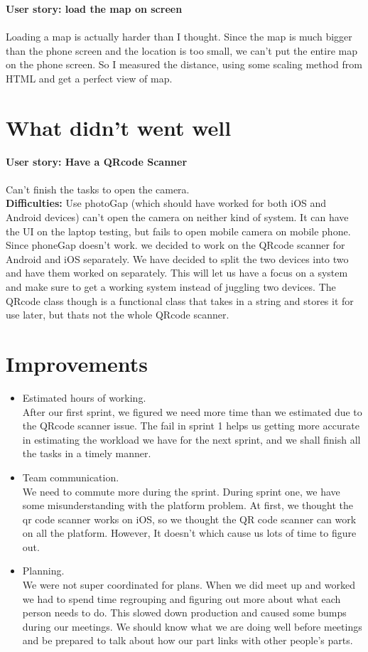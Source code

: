 \documentclass[12pt]{article}
\begin{document}
\textbf{User story: load the map on screen} \\ \\
Loading a map is actually harder than I thought. Since the map is much bigger than the phone screen and the location is too small, we can’t put the entire map on the phone screen. So I measured the distance, using some scaling method from HTML and get a perfect view of map. \\



\section{What didn't went well}


\textbf{User story: Have a QR­code Scanner} \\ \\
Can’t finish the tasks to open the camera.  \\

\textbf{Difficulties: } Use photoGap (which should have worked for both iOS and Android devices) can’t open the camera on neither kind of system. It can have the UI on the laptop testing, but fails to open mobile camera on mobile phone. Since phoneGap doesn’t work. we decided to work on the QRcode scanner for Android and iOS separately.  We have decided to split the two devices into two and have them worked on separately. This will let us have a focus on a system and make sure to get a working system instead of juggling two devices. The QRcode class though is a functional class that takes in a string and stores it for use later, but thats not the whole QRcode scanner.

\section{Improvements}
\begin{itemize}
\item Estimated hours of working. \\
After our first sprint, we figured we need more time than we estimated due to the QRcode scanner issue. The fail in sprint 1 helps us getting more accurate in estimating the workload we have for the next sprint, and we shall finish all the tasks in a timely manner.

\item Team communication. \\
We need to commute more during the sprint. During sprint one, we have some misunderstanding with the platform problem. At first, we thought the qr code scanner works
on iOS, so we thought the QR code scanner can work on all the platform. However, It doesn't which cause us lots of time to figure out.

\item Planning. \\
We were not super coordinated for plans. When we did meet up and worked we had to spend time regrouping and figuring out more about what each person needs to do. This slowed down production and caused some bumps during our meetings. We should know what we are doing well before meetings and be prepared to talk about how our part links with other people’s parts.
\end{itemize}
\end{document}
